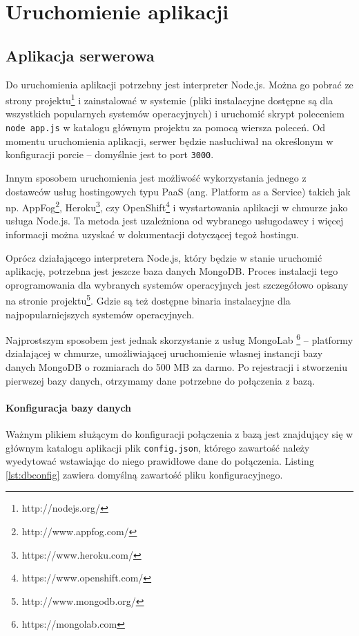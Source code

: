 \documentclass[twoside,a4paper,openright,12pt]{book}
\begin{document}
\chapter{Uruchomienie aplikacji}

\section{Aplikacja serwerowa}

Do uruchomienia aplikacji potrzebny jest interpreter Node.js. Można go pobrać ze strony projektu\footnote{http://nodejs.org/} i zainstalować w systemie (pliki instalacyjne dostępne są dla wszystkich popularnych systemów operacyjnych) i uruchomić skrypt poleceniem \texttt{node app.js} w katalogu głównym projektu za pomocą wiersza poleceń.
Od momentu uruchomienia aplikacji, serwer będzie nasłuchiwał na określonym w konfiguracji porcie -- domyślnie jest to port \texttt{3000}.

Innym sposobem uruchomienia jest możliwość wykorzystania jednego z dostawców usług hostingowych typu PaaS (ang. Platform as a Service) takich jak np. \mbox{AppFog}\footnote{http://www.appfog.com/}, Heroku\footnote{https://www.heroku.com/}, czy OpenShift\footnote{https://www.openshift.com/} i wystartowania aplikacji w chmurze jako usługa Node.js. Ta metoda jest uzależniona od wybranego usługodawcy i więcej informacji można uzyskać w dokumentacji dotyczącej tegoż hostingu.

Oprócz działającego interpretera Node.js, który będzie w stanie uruchomić aplikację, potrzebna jest jeszcze baza danych MongoDB.
Proces instalacji tego oprogramowania dla wybranych systemów operacyjnych jest szczegółowo opisany na stronie projektu\footnote{http://www.mongodb.org/}. Gdzie są też dostępne binaria instalacyjne dla najpopularniejszych systemów operacyjnych.

Najprostszym sposobem jest jednak skorzystanie z usług MongoLab \footnote{https://mongolab.com} -- platformy działającej w chmurze, umożliwiającej uruchomienie własnej instancji bazy danych MongoDB o rozmiarach do 500 MB za darmo.
Po rejestracji i stworzeniu pierwszej bazy danych, otrzymamy dane potrzebne do połączenia z bazą.

\subsubsection{Konfiguracja bazy danych}

Ważnym plikiem służącym do konfiguracji połączenia z bazą jest znajdujący się w głównym katalogu aplikacji plik \texttt{config.json}, którego zawartość należy wyedytować wstawiając do niego prawidłowe dane do połączenia.
Listing \ref{lst:dbconfig} zawiera domyślną zawartość pliku konfiguracyjnego.\\
\end{document}
